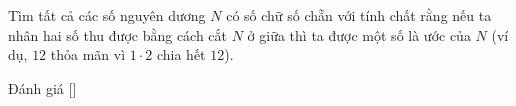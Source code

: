 \ifshowproblem
\begin{problem}\label{problem:ROU-2015-JBMO-TST-D2-P1}
    Tìm tất cả các số nguyên dương \( N \) có số chữ số chẵn với tính chất rằng nếu ta nhân hai số thu được bằng cách cắt \( N \) ở giữa
    thì ta được một số là ước của \( N \) (ví dụ, \(12\) thỏa mãn vì \(1 \cdot 2\) chia hết \(12\)).
\end{problem}
\fi

\ifshowinfo
Đánh giá [\textbf{}]\footnotemark
{}
\fi
